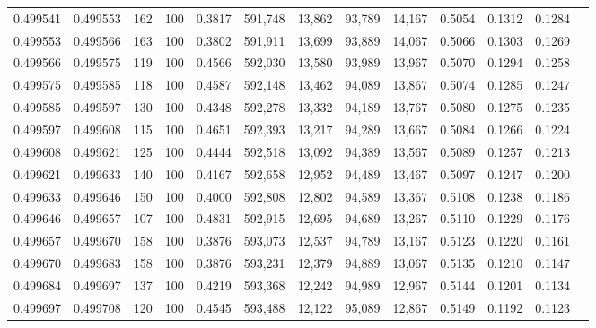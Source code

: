 \begin{tabular}{rrrrrrrrrrrrr}
0.499541 & 0.499553 &   162 & 100 &                                     0.3817 & 591,748 &  13,862 &  93,789 &  14,167 & 0.5054 & 0.1312 & 0.1284 \\
0.499553 & 0.499566 &   163 & 100 &                                     0.3802 & 591,911 &  13,699 &  93,889 &  14,067 & 0.5066 & 0.1303 & 0.1269 \\
0.499566 & 0.499575 &   119 & 100 &                                     0.4566 & 592,030 &  13,580 &  93,989 &  13,967 & 0.5070 & 0.1294 & 0.1258 \\
0.499575 & 0.499585 &   118 & 100 &                                     0.4587 & 592,148 &  13,462 &  94,089 &  13,867 & 0.5074 & 0.1285 & 0.1247 \\
0.499585 & 0.499597 &   130 & 100 &                                     0.4348 & 592,278 &  13,332 &  94,189 &  13,767 & 0.5080 & 0.1275 & 0.1235 \\
0.499597 & 0.499608 &   115 & 100 &                                     0.4651 & 592,393 &  13,217 &  94,289 &  13,667 & 0.5084 & 0.1266 & 0.1224 \\
0.499608 & 0.499621 &   125 & 100 &                                     0.4444 & 592,518 &  13,092 &  94,389 &  13,567 & 0.5089 & 0.1257 & 0.1213 \\
0.499621 & 0.499633 &   140 & 100 &                                     0.4167 & 592,658 &  12,952 &  94,489 &  13,467 & 0.5097 & 0.1247 & 0.1200 \\
0.499633 & 0.499646 &   150 & 100 &                                     0.4000 & 592,808 &  12,802 &  94,589 &  13,367 & 0.5108 & 0.1238 & 0.1186 \\
0.499646 & 0.499657 &   107 & 100 &                                     0.4831 & 592,915 &  12,695 &  94,689 &  13,267 & 0.5110 & 0.1229 & 0.1176 \\
0.499657 & 0.499670 &   158 & 100 &                                     0.3876 & 593,073 &  12,537 &  94,789 &  13,167 & 0.5123 & 0.1220 & 0.1161 \\
0.499670 & 0.499683 &   158 & 100 &                                     0.3876 & 593,231 &  12,379 &  94,889 &  13,067 & 0.5135 & 0.1210 & 0.1147 \\
0.499684 & 0.499697 &   137 & 100 &                                     0.4219 & 593,368 &  12,242 &  94,989 &  12,967 & 0.5144 & 0.1201 & 0.1134 \\
0.499697 & 0.499708 &   120 & 100 &                                     0.4545 & 593,488 &  12,122 &  95,089 &  12,867 & 0.5149 & 0.1192 & 0.1123 \\

\end{tabular}
